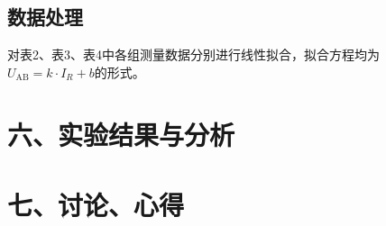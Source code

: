 \documentclass[10.5pt]{config}
\begin{document}
\subsection{数据处理}

对表2、表3、表4中各组测量数据分别进行线性拟合，拟合方程均为 $U_{\mathrm{AB}} = k \cdot I_R + b$的形式。

\section*{六、实验结果与分析}

\section*{七、讨论、心得}
\end{document}
